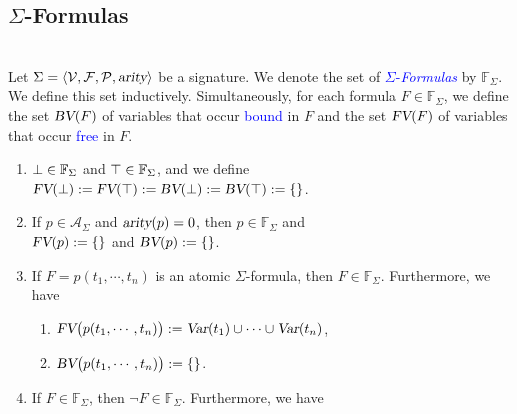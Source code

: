 \subsection{$\Sigma$-Formulas}
\begin{Definition}
\label{predicate-formula} \hspace*{\fill}
  \\
Let $\Sigma = \langle \mathcal{V}, \mathcal{F}, \mathcal{P}, \textsl{arity} \rangle$ be a signature.
    We denote the set of \textcolor{blue}{$\Sigma$-\emph{Formulas}} by $\mathbb{F}_\Sigma$.
    We define this set inductively.
    Simultaneously, for each formula $F \in \mathbb{F}_\Sigma$, we define the set $\textsl{BV}(F)$ of variables
    that occur \textcolor{blue}{bound} in $F$ and the set $\textsl{FV}(F)$ of variables that occur
    \textcolor{blue}{free} in $F$. 
    \begin{enumerate}
    \item $\bot \in \mathbb{F}_\Sigma$ and $\top \in \mathbb{F}_\Sigma$, and we define \\[0.2cm]
          \hspace*{1.3cm} $\textsl{FV}(\bot) := \textsl{FV}(\top) := \textsl{BV}(\bot) := \textsl{BV}(\top) := \{\}$.
    \item If $p \in \mathcal{A}_\Sigma$ and $\textsl{arity}(p)= 0$, then $p \in \mathbb{F}_\Sigma$ and    
          \\[0.2cm]
          \hspace*{1.3cm}
          \hspace*{1.3cm} $\textsl{FV}(p) := \{\}$ \quad and \quad $\textsl{BV}(p) := \{\}$.
    \item If $F = p(t_1,\cdots,t_n)$ is an atomic $\Sigma$-formula, then $F \in \mathbb{F}_\Sigma$.
          Furthermore, we have
          \begin{enumerate}
          \item $\textsl{FV}\bigl(p(t_1,\cdots,t_n) \bigr) := \textsl{Var}(t_1) \cup \cdots \cup \textsl{Var}(t_n)$,
          \item $\textsl{BV}\bigl(p(t_1,\cdots,t_n) \bigr) := \{\}$.
          \end{enumerate}
    \item If $F \in \mathbb{F}_\Sigma$, then $\neg F \in \mathbb{F}_\Sigma$.  Furthermore, we have
          \begin{enumerate}

\end{enumerate}
\end{enumerate}
\end{Definition}

